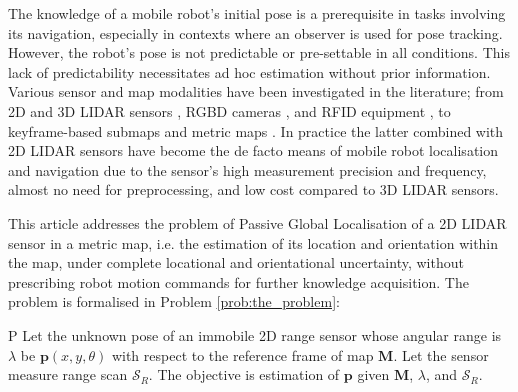 The knowledge of a mobile robot's initial pose is a prerequisite in tasks
involving its navigation, especially in contexts where an observer is used for
pose tracking. However, the robot's pose is not predictable or pre-settable in
all conditions. This lack of predictability necessitates ad hoc estimation
without prior information. Various sensor and map modalities have been
investigated in the literature; from 2D and 3D LIDAR sensors
\cite{als_eth,Cop2018a}, RGBD cameras \cite{Guo2016}, and RFID equipment
\cite{Tzitzis2023b}, to keyframe-based submaps \cite{Lowry2016} and metric maps
\cite{Rosen2021}. In practice the latter combined with 2D LIDAR sensors have
become the de facto means of mobile robot localisation and navigation due to
the sensor's high measurement precision and frequency, almost no need for
preprocessing, and low cost compared to 3D LIDAR sensors.

This article addresses the problem of Passive Global Localisation of a 2D LIDAR
sensor in a metric map, i.e. the estimation of its location and orientation
within the map, under complete locational and orientational uncertainty,
without prescribing robot motion commands
for further knowledge acquisition. The problem is
formalised in Problem \ref{prob:the_problem}:

\begin{customprb}{P}
  \label{prob:the_problem}
  Let the unknown pose of an immobile 2D range sensor whose angular range is
  $\lambda$ be $\bm{p}(x,y,\theta)$ with respect to the
  reference frame of map $\bm{M}$. Let the sensor measure range scan
  $\mathcal{S}_R$. The objective is estimation of $\bm{p}$ given $\bm{M}$,
  $\lambda$, and $\mathcal{S}_R$.
\end{customprb}

